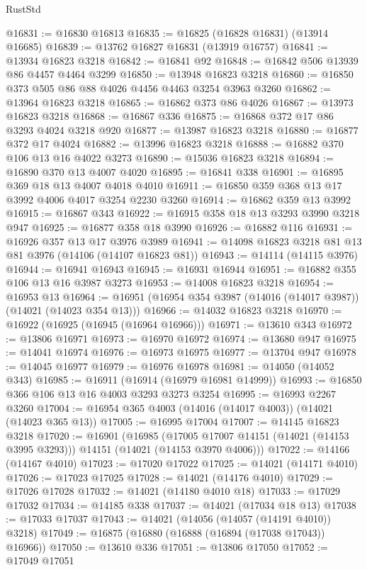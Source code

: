 \begin{lexlean}{RustStd}
\begin{coremodule}
{\begin{coremodule}
{{{{{{{{{{{{{{{{{{{{{{{{{{{{{{{{{{{{{{{@16831 := @16830 @16813
@16835 := @16825 (@16828 @16831) (@13914 @16685)
@16839 := @13762 @16827 @16831 (@13919 @16757)
@16841 := @13934 @16823 @3218
@16842 := @16841 @92
@16848 := @16842 @506 @13939 @86 @4457 @4464 @3299
@16850 := @13948 @16823 @3218
@16860 := @16850 @373 @505 @86 @88 @4026 @4456 @4463 @3254 @3963 @3260
@16862 := @13964 @16823 @3218
@16865 := @16862 @373 @86 @4026
@16867 := @13973 @16823 @3218
@16868 := @16867 @336
@16875 := @16868 @372 @17 @86 @3293 @4024 @3218 @920
@16877 := @13987 @16823 @3218
@16880 := @16877 @372 @17 @4024
@16882 := @13996 @16823 @3218
@16888 := @16882 @370 @106 @13 @16 @4022 @3273
@16890 := @15036 @16823 @3218
@16894 := @16890 @370 @13 @4007 @4020
@16895 := @16841 @338
@16901 := @16895 @369 @18 @13 @4007 @4018 @4010
@16911 := @16850 @359 @368 @13 @17 @3992 @4006 @4017 @3254 @2230 @3260
@16914 := @16862 @359 @13 @3992
@16915 := @16867 @343
@16922 := @16915 @358 @18 @13 @3293 @3990 @3218 @947
@16925 := @16877 @358 @18 @3990
@16926 := @16882 @116
@16931 := @16926 @357 @13 @17 @3976 @3989
@16941 := @14098 @16823 @3218 @81 @13 @81 @3976 (@14106 (@14107 @16823 @81))
@16943 := @14114 (@14115 @3976)
@16944 := @16941 @16943
@16945 := @16931 @16944
@16951 := @16882 @355 @106 @13 @16 @3987 @3273
@16953 := @14008 @16823 @3218
@16954 := @16953 @13
@16964 := @16951 (@16954 @354 @3987 (@14016 (@14017 @3987)) (@14021 (@14023 @354 @13)))
@16966 := @14032 @16823 @3218
@16970 := @16922 (@16925 (@16945 (@16964 @16966)))
@16971 := @13610 @343
@16972 := @13806 @16971
@16973 := @16970 @16972
@16974 := @13680 @947
@16975 := @14041 @16974
@16976 := @16973 @16975
@16977 := @13704 @947
@16978 := @14045 @16977
@16979 := @16976 @16978
@16981 := @14050 (@14052 @343)
@16985 := @16911 (@16914 (@16979 @16981 @14999))
@16993 := @16850 @366 @106 @13 @16 @4003 @3293 @3273 @3254
@16995 := @16993 @2267 @3260
@17004 := @16954 @365 @4003 (@14016 (@14017 @4003)) (@14021 (@14023 @365 @13))
@17005 := @16995 @17004
@17007 := @14145 @16823 @3218
@17020 := @16901
    (@16985
      (@17005 @17007 @14151 (@14021 (@14153 @3995 @3293)))
      @14151
      (@14021 (@14153 @3970 @4006)))
@17022 := @14166 (@14167 @4010)
@17023 := @17020 @17022
@17025 := @14021 (@14171 @4010)
@17026 := @17023 @17025
@17028 := @14021 (@14176 @4010)
@17029 := @17026 @17028
@17032 := @14021 (@14180 @4010 @18)
@17033 := @17029 @17032
@17034 := @14185 @338
@17037 := @14021 (@17034 @18 @13)
@17038 := @17033 @17037
@17043 := @14021 (@14056 (@14057 (@14191 @4010)) @3218)
@17049 := @16875 (@16880 (@16888 (@16894 (@17038 @17043)) @16966))
@17050 := @13610 @336
@17051 := @13806 @17050
@17052 := @17049 @17051
}}}}}}}}}}}}}}}}}}}}}}}}}}}}}}}}}}}}}}}
\end{coremodule}}
\end{coremodule}
\end{lexlean}
